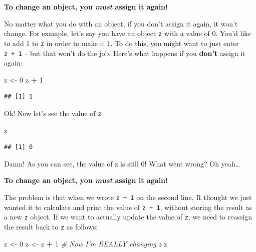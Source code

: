 \documentclass[
]{book}
\newenvironment{Shaded}{\begin{snugshade}}{\end{snugshade}}
\newcommand{\CommentTok}[1]{\textcolor[rgb]{0.56,0.35,0.01}{\textit{#1}}}
\newcommand{\DecValTok}[1]{\textcolor[rgb]{0.00,0.00,0.81}{#1}}
\newcommand{\NormalTok}[1]{#1}
\newcommand{\OperatorTok}[1]{\textcolor[rgb]{0.81,0.36,0.00}{\textbf{#1}}}
\newcommand{\StringTok}[1]{\textcolor[rgb]{0.31,0.60,0.02}{#1}}
\begin{document}
\textbf{To change an object, you \textit{must} assign it again!}

No matter what you do with an object, if you don't assign it again, it won't change. For example, let's say you have an object \texttt{z} with a value of 0. You'd like to add 1 to \texttt{z} in order to make it 1. To do this, you might want to just enter \texttt{z\ +\ 1} -- but that won't do the job. Here's what happens if you \textbf{don't} assign it again:

\begin{Shaded}
\begin{Highlighting}[]
\NormalTok{z <-}\StringTok{ }\DecValTok{0}
\NormalTok{z }\OperatorTok{+}\StringTok{ }\DecValTok{1}
\end{Highlighting}
\end{Shaded}

\begin{verbatim}
## [1] 1
\end{verbatim}

Ok! Now let's see the value of \texttt{z}

\begin{Shaded}
\begin{Highlighting}[]
\NormalTok{z}
\end{Highlighting}
\end{Shaded}

\begin{verbatim}
## [1] 0
\end{verbatim}

Damn! As you can see, the value of z is still 0! What went wrong? Oh yeah\ldots{}

\textbf{To change an object, you \emph{must} assign it again!}

The problem is that when we wrote \texttt{z\ +\ 1} on the second line, R thought we just wanted it to calculate and print the value of \texttt{z\ +\ 1}, without storing the result as a new \texttt{z} object. If we want to actually update the value of \texttt{z}, we need to reassign the result back to \texttt{z} as follows:

\begin{Shaded}
\begin{Highlighting}[]
\NormalTok{z <-}\StringTok{ }\DecValTok{0}
\NormalTok{z <-}\StringTok{ }\NormalTok{z }\OperatorTok{+}\StringTok{ }\DecValTok{1}  \CommentTok{# Now I'm REALLY changing z}
\NormalTok{z}
\end{Highlighting}
\end{Shaded}
\end{document}
